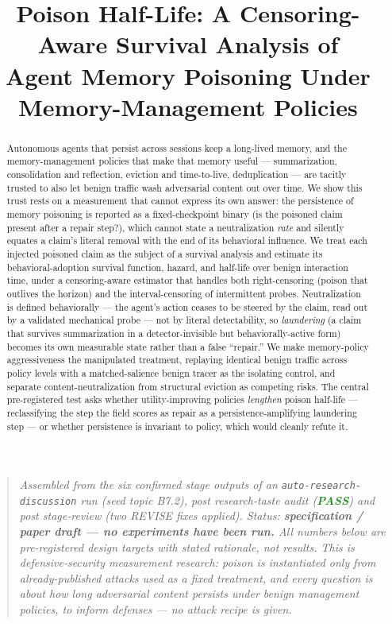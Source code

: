\documentclass[11pt]{article}
\title{\textbf{Poison Half-Life: A Censoring-Aware Survival Analysis of\\ Agent Memory Poisoning Under Memory-Management Policies}}
\author{}
\date{}
\begin{document}
\maketitle
\vspace{-2em}

\begin{quote}
\small\textit{Assembled from the six confirmed stage outputs of an \texttt{auto-research-discussion} run (seed topic B7.2), post research-taste audit (\textcolor{ForestGreen}{\textbf{PASS}}) and post stage-review (two REVISE fixes applied). Status: \textbf{specification / paper draft --- no experiments have been run.} All numbers below are pre-registered design targets with stated rationale, not results. This is defensive-security measurement research: poison is instantiated only from already-published attacks used as a fixed treatment, and every question is about how long adversarial content persists under benign management policies, to inform defenses --- no attack recipe is given.}
\end{quote}

\begin{abstract}
Autonomous agents that persist across sessions keep a long-lived memory, and the memory-management policies that make that memory useful --- summarization, consolidation and reflection, eviction and time-to-live, deduplication --- are tacitly trusted to also let benign traffic wash adversarial content out over time. We show this trust rests on a measurement that cannot express its own answer: the persistence of memory poisoning is reported as a fixed-checkpoint binary (is the poisoned claim present after a repair step?), which cannot state a neutralization \emph{rate} and silently equates a claim's literal removal with the end of its behavioral influence. We treat each injected poisoned claim as the subject of a survival analysis and estimate its behavioral-adoption survival function, hazard, and half-life over benign interaction time, under a censoring-aware estimator that handles both right-censoring (poison that outlives the horizon) and the interval-censoring of intermittent probes. Neutralization is defined behaviorally --- the agent's action ceases to be steered by the claim, read out by a validated mechanical probe --- not by literal detectability, so \emph{laundering} (a claim that survives summarization in a detector-invisible but behaviorally-active form) becomes its own measurable state rather than a false ``repair.'' We make memory-policy aggressiveness the manipulated treatment, replaying identical benign traffic across policy levels with a matched-salience benign tracer as the isolating control, and separate content-neutralization from structural eviction as competing risks. The central pre-registered test asks whether utility-improving policies \emph{lengthen} poison half-life --- reclassifying the step the field scores as repair as a persistence-amplifying laundering step --- or whether persistence is invariant to policy, which would cleanly refute it.
\end{abstract}
\end{document}
